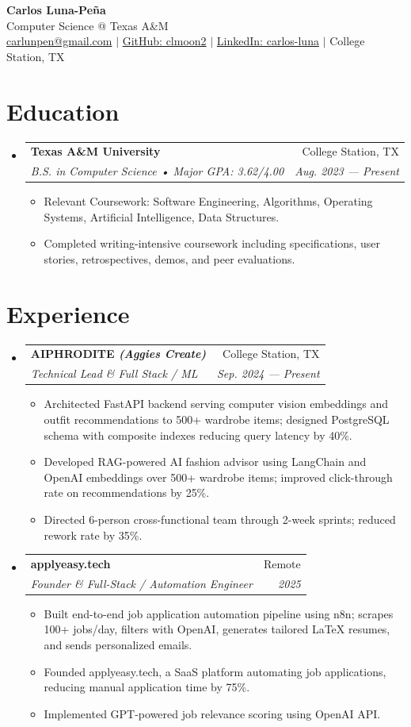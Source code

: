 \documentclass[letterpaper,11pt]{article}
\makeatletter
\newcommand{\resumeItem}[1]{%
  \item\small{{#1 \vspace{-2pt}}}
}
\newcommand{\resumeSubheading}[4]{%
  \vspace{-2pt}\item
    \begin{tabular*}{0.97\textwidth}[t]{l@{\extracolsep{\fill}}r}
      \textbf{#1} & #2 \\
      \textit{\small#3} & \textit{\small #4} \\
    \end{tabular*}\vspace{-7pt}
}
\newcommand{\resumeSubHeadingListStart}{\begin{itemize}[leftmargin=0.15in, label={}]}
\newcommand{\resumeSubHeadingListEnd}{\end{itemize}}
\newcommand{\resumeItemListStart}{\begin{itemize}}
\newcommand{\resumeItemListEnd}{\end{itemize}\vspace{-5pt}}
\makeatother
\begin{document}
\begin{center}
\textbf{\Large Carlos Luna-Peña} \\ \vspace{1pt}
Computer Science @ Texas A\&M \\ \vspace{1pt}
\href{mailto:carlunpen@gmail.com}{carlunpen@gmail.com} $|$ 
\href{https://github.com/clmoon2}{GitHub: clmoon2} $|$ 
\href{https://linkedin.com/in/carlos-luna}{LinkedIn: carlos-luna} $|$ 
College Station, TX
\end{center}

\section{Education}
\resumeSubHeadingListStart
\resumeSubheading
{Texas A\&M University}{College Station, TX}
{B.S. in Computer Science • Major GPA: 3.62/4.00}{Aug. 2023 — Present}
\resumeItemListStart
\resumeItem{Relevant Coursework: Software Engineering, Algorithms, Operating Systems, Artificial Intelligence, Data Structures.}
\resumeItem{Completed writing-intensive coursework including specifications, user stories, retrospectives, demos, and peer evaluations.}
\resumeItemListEnd
\resumeSubHeadingListEnd

\section{Experience}
\resumeSubHeadingListStart
\resumeSubheading
{AIPHRODITE \emph{(Aggies Create)}}{College Station, TX}
{Technical Lead \& Full Stack / ML}{Sep. 2024 — Present}
\resumeItemListStart
\resumeItem{Architected FastAPI backend serving computer vision embeddings and outfit recommendations to 500+ wardrobe items; designed PostgreSQL schema with composite indexes reducing query latency by 40\%.}
\resumeItem{Developed RAG-powered AI fashion advisor using LangChain and OpenAI embeddings over 500+ wardrobe items; improved click-through rate on recommendations by 25\%.}
\resumeItem{Directed 6-person cross-functional team through 2-week sprints; reduced rework rate by 35\%.}
\resumeItemListEnd
\resumeSubheading
{applyeasy.tech}{Remote}
{Founder \& Full-Stack / Automation Engineer}{2025}
\resumeItemListStart
\resumeItem{Built end-to-end job application automation pipeline using n8n; scrapes 100+ jobs/day, filters with OpenAI, generates tailored LaTeX resumes, and sends personalized emails.}
\resumeItem{Founded applyeasy.tech, a SaaS platform automating job applications, reducing manual application time by 75\%.}
\resumeItem{Implemented GPT-powered job relevance scoring using OpenAI API.}
\resumeItemListEnd
\resumeSubHeadingListEnd
\end{document}
